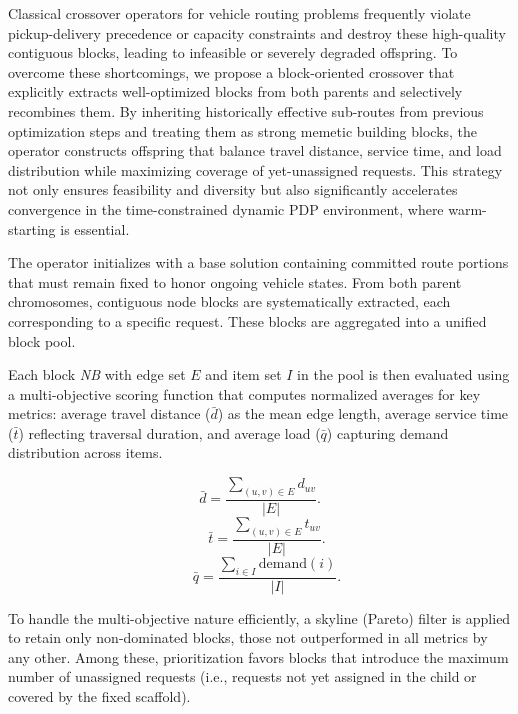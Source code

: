 \documentclass[pdflatex]{sn-jnl}
\begin{document}
Classical crossover operators for vehicle routing problems frequently violate pickup-delivery precedence or capacity constraints and destroy these high-quality contiguous blocks, leading to infeasible or severely degraded offspring. To overcome these shortcomings, we propose a block-oriented crossover that explicitly extracts well-optimized blocks from both parents and selectively recombines them. By inheriting historically effective sub-routes from previous optimization steps and treating them as strong memetic building blocks, the operator constructs offspring that balance travel distance, service time, and load distribution while maximizing coverage of yet-unassigned requests. This strategy not only ensures feasibility and diversity but also significantly accelerates convergence in the time-constrained dynamic PDP environment, where warm-starting is essential. %

The operator initializes with a base solution containing committed route portions that must remain fixed to honor ongoing vehicle states. From both parent chromosomes, contiguous node blocks are systematically extracted, each corresponding to a specific request. These blocks are aggregated into a unified block pool. 

Each block \textit{NB} with edge set \(E\) and item set \(I\) in the pool is then evaluated using a multi-objective scoring function that computes normalized averages for key metrics: average travel distance (\(\bar{d}\)) as the mean edge length, average service time (\(\bar{t}\)) reflecting traversal duration, and average load (\(\bar{q}\)) capturing demand distribution across items.

\begin{equation}
\bar{d} = \frac{\sum_{(u,v) \in E} d_{uv}}{|E|}.
\end{equation}
\begin{equation}
 \quad \bar{t} = \frac{\sum_{(u,v) \in E} t_{uv}}{|E|}.
\end{equation}
\begin{equation}
 \quad \bar{q} = \frac{\sum_{i \in I} \text{demand}(i)}{|I|}.
\end{equation}

To handle the multi-objective nature efficiently, a skyline (Pareto) filter is applied to retain only non-dominated blocks, those not outperformed in all metrics by any other. Among these, prioritization favors blocks that introduce the maximum number of unassigned requests (i.e., requests not yet assigned in the child or covered by the fixed scaffold).
\end{document}

